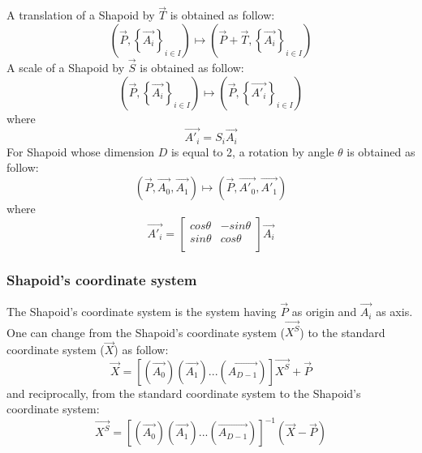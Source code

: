 \documentclass[12pt, a4paper]{article}
\begin{document}
A translation of a Shapoid by $\overrightarrow{T}$ is obtained as follow:\\
\begin{equation}
\left(\overrightarrow{P},\left\lbrace\overrightarrow{A_i}\right\rbrace_{i\in I}\right)\mapsto\left(\overrightarrow{P}+\overrightarrow{T},\left\lbrace\overrightarrow{A_i}\right\rbrace_{i\in I}\right)
\end{equation} 
A scale of a Shapoid by $\overrightarrow{S}$ is obtained as follow:\\
\begin{equation}
\left(\overrightarrow{P},\left\lbrace\overrightarrow{A_i}\right\rbrace_{i\in I}\right)\mapsto\left( \overrightarrow{P},\left\lbrace\overrightarrow{A'_i}\right\rbrace_{i\in I}\right)
\end{equation} 
where
\begin{equation}
\overrightarrow{A'_i}=S_i\overrightarrow{A_i}
\end{equation}
For Shapoid whose dimension $D$ is equal to 2, a rotation by angle $\theta$ is obtained as follow:\\
\begin{equation}
\left(\overrightarrow{P},\overrightarrow{A_0},\overrightarrow{A_1}\right)\mapsto\left(\overrightarrow{P},\overrightarrow{A'_0},\overrightarrow{A'_1}\right)
\end{equation} 
where
\begin{equation}
\overrightarrow{A'_i}=\left[
\begin{array}{cc}
cos\theta&-sin\theta\\
sin\theta&cos\theta\\
\end{array}
\right]
\overrightarrow{A_i}
\end{equation}

\subsubsection{Shapoid's coordinate system}

The Shapoid's coordinate system is the system having $\overrightarrow{P}$ as origin and $\overrightarrow{A_i}$ as axis. One can change from the Shapoid's coordinate system ($\overrightarrow{X^S}$) to the standard coordinate system ($\overrightarrow{X}$) as follow:\\
\begin{equation}
\overrightarrow{X}=\left[\left(\overrightarrow{A_0}\right)\left(\overrightarrow{A_1}\right)...\left(\overrightarrow{A_{D-1}}\right)\right]\overrightarrow{X^S}+\overrightarrow{P}
\end{equation}
and reciprocally, from the standard coordinate system to the Shapoid's coordinate system:\\
\begin{equation}
\overrightarrow{X^S}=\left[\left(\overrightarrow{A_0}\right)\left(\overrightarrow{A_1}\right)...\left(\overrightarrow{A_{D-1}}\right)\right]^{-1}\left(\overrightarrow{X}-\overrightarrow{P}\right)
\end{equation}
\end{document}
